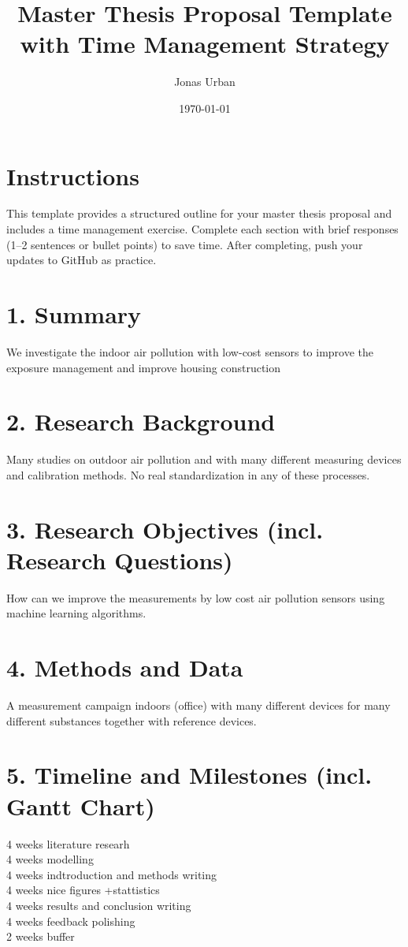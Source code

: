 \documentclass[a4paper,12pt]{article}
\title{Master Thesis Proposal Template with Time Management Strategy}
\author{Jonas Urban}
\date{\today}
\begin{document}
\maketitle

\section*{Instructions}
This template provides a structured outline for your master thesis proposal and includes a time management exercise. Complete each section with brief responses (1–2 sentences or bullet points) to save time. After completing, push your updates to GitHub as practice.

\section{1. Summary}
We investigate the indoor air pollution with low-cost sensors to improve the exposure management and improve housing construction\\

\section{2. Research Background}
Many studies on outdoor air pollution and with many different measuring devices and calibration methods. No real standardization in any of these processes. \\

\section{3. Research Objectives (incl. Research Questions)}
How can we improve the measurements by low cost air pollution sensors using machine learning algorithms. 

\section{4. Methods and Data}
A measurement campaign indoors (office) with many different devices for many different substances together with reference devices.\\

\section{5. Timeline and Milestones (incl. Gantt Chart)}
4 weeks literature researh\\
4 weeks modelling \\
4 weeks indtroduction and methods writing \\
4 weeks nice figures +stattistics \\
4 weeks results and conclusion writing \\
4 weeks feedback polishing \\
2 weeks buffer \\
\end{document}
